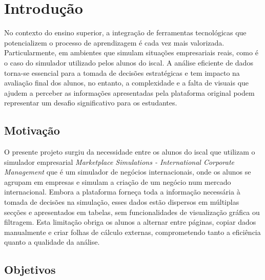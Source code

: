 

\chapter{Introdução}
\label{ch:introducao}


No contexto do ensino superior, a integração de ferramentas tecnológicas que potencializem o processo de aprendizagem é cada vez mais valorizada. Particularmente, em ambientes que simulam situações empresariais reais, como é o caso do simulador utilizado pelos alunos do \gls{iscal}.  A análise eficiente de dados torna-se essencial para a tomada de decisões estratégicas e tem impacto na avaliação final dos alunos, no entanto, a complexidade e a falta de visuais que ajudem a perceber as informações apresentadas pela plataforma original podem representar um desafio significativo para os estudantes.

\section{Motivação}
O presente projeto surgiu da necessidade  entre os alunos do \gls{iscal} que utilizam o simulador empresarial \textit{Marketplace Simulations - International Corporate Management} que é um simulador de negócios internacionais, onde os alunos se agrupam em empresas e simulam a criação de um negócio num mercado internacional. Embora a plataforma forneça toda a informação necessária à tomada de decisões na simulação, esses dados estão dispersos em múltiplas secções e apresentados em tabelas, sem funcionalidades de visualização gráfica ou filtragem. Esta limitação obriga os alunos a alternar entre páginas, copiar dados manualmente e criar folhas de cálculo externas, comprometendo tanto a eficiência quanto a qualidade da análise.


\section{Objetivos}


